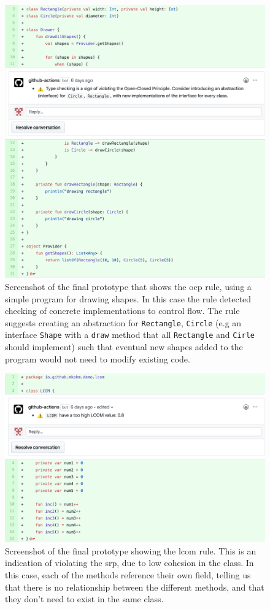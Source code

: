 \begin{figure}[h!]
    \centering
    \includegraphics[width=\textwidth]{images/final_ocp.png}
    \caption{Screenshot of the final prototype that shows the \gls{ocp} rule, using a simple program for drawing shapes. In this case the rule detected checking of concrete implementations to control flow. The rule suggests creating an abstraction for \texttt{Rectangle}, \texttt{Circle} (e.g an interface \texttt{Shape} with a \texttt{draw} method that all \texttt{Rectangle} and \texttt{Cirle} should implement) such that eventual new shapes added to the program would not need to modify existing code.}
\end{figure}

\begin{figure}[h!]
    \centering
    \includegraphics[width=\textwidth]{images/final_lcom.png}
    \caption{Screenshot of the final prototype showing the \gls{lcom} rule. This is an indication of violating the \gls{srp}, due to low cohesion in the class. In this case, each of the methods reference their own field, telling us that there is no relationship between the different methods, and that they don't need to exist in the same class.}
\end{figure}

